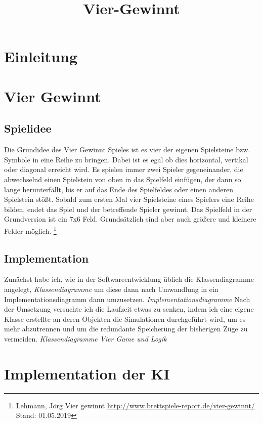 \documentclass[12pt,a4paper,ngerman]{article}
\title{Vier-Gewinnt}
\author{}
\begin{document}
	\maketitle
	\newpage
	\tableofcontents
	\newpage
	\section{Einleitung}
	
	\section{Vier Gewinnt}
	\subsection{Spielidee}
	Die Grundidee des \glqq Vier Gewinnt\grqq{} Spieles ist es vier der eigenen Spielsteine bzw. Symbole in eine Reihe zu bringen.
	Dabei ist es egal ob dies horizontal, vertikal oder diagonal erreicht wird.
	Es spielen immer zwei Spieler gegeneinander, die abwechselnd einen Spielstein von oben in das Spielfeld einfügen, der dann so lange herunterfällt, bis er auf das Ende des Spielfeldes oder einen anderen Spielstein stößt.
	Sobald zum ersten Mal vier Spielsteine eines Spielers eine Reihe bilden, endet das Spiel und der betreffende Spieler gewinnt.
	Das Spielfeld in der Grundversion ist ein 7x6 Feld. Grundsätzlich sind aber auch größere und kleinere Felder möglich.
	\footnote{Lehmann, Jörg \glqq Vier gewinnt\grqq{} \url{http://www.brettspiele-report.de/vier-gewinnt/} Stand: 01.05.2019}
	\subsection{Implementation}
	Zunächst habe ich, wie in der Softwareentwicklung üblich die Klassendiagramme angelegt,
	\textit{Klassendiagramme}
	 um diese dann nach Umwandlung in ein Implementationsdiagramm dann umzusetzen.
	\textit{Implementationsdiagramme}
	Nach der Umsetzung versuchte ich die Laufzeit etwas zu senken, indem ich eine eigene Klasse erstellte an deren Objekten die Simulationen durchgeführt wird, um es mehr abzutrennen und um die redundante Speicherung der bisherigen Züge zu vermeiden.
	\textit{Klassendiagramme Vier Game und Logik}
	\section{Implementation der KI}
\end{document}
